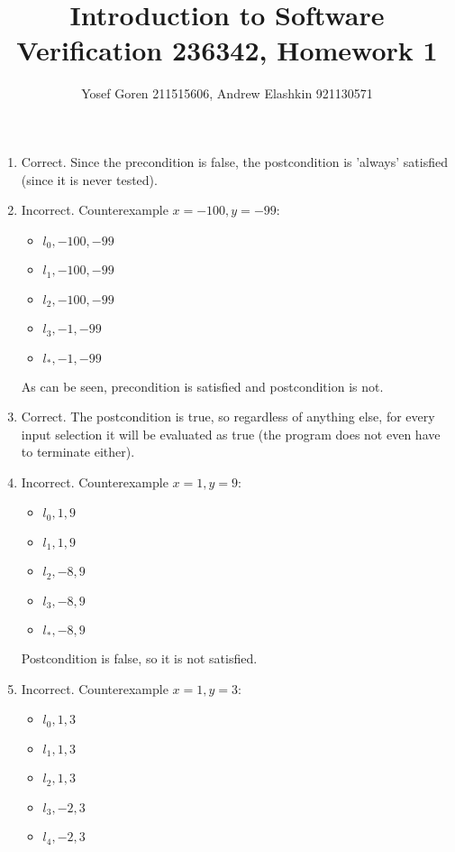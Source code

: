\documentclass{article}
\begin{document}
\author{Yosef Goren 211515606, Andrew Elashkin 921130571}
\title{Introduction to Software Verification 236342, Homework 1}
\maketitle
\section{}
\begin{enumerate}[label=\Alph*.]
    \item Correct. Since the precondition is false, the postcondition is 'always' satisfied (since it is never tested).
    \item Incorrect. Counterexample $x=-100,y=-99$:
    \begin{itemize}
        \item $l_0, -100, -99$
        \item $l_1, -100, -99$
        \item $l_2, -100, -99$
        \item $l_3, -1, -99$
        \item $l_*, -1, -99$
    \end{itemize}
    As can be seen, precondition is satisfied and postcondition is not.
    \item Correct. The postcondition is true, so regardless of anything else,
    for every input selection it will be evaluated as true (the program does not even have to terminate either).
    \item Incorrect. Counterexample $x=1, y=9$:
    \begin{itemize}
        \item $l_0, 1, 9$
        \item $l_1, 1, 9$
        \item $l_2, -8, 9$
        \item $l_3, -8, 9$
        \item $l_*, -8, 9$
    \end{itemize}
    Postcondition is false, so it is not satisfied.
    \item Incorrect. Counterexample $x=1, y=3$:
    \begin{itemize}
        \item $l_0, 1, 3$
        \item $l_1, 1, 3$
        \item $l_2, 1, 3$
        \item $l_3, -2, 3$
        \item $l_4, -2, 3$

\end{itemize}
\end{enumerate}
\end{document}
